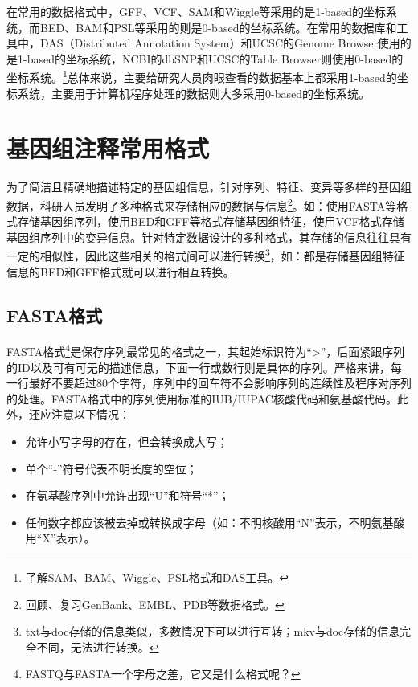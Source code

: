 \documentclass[11pt,a4paper,twoside]{book}
\begin{document}
在常用的数据格式中，GFF、VCF、SAM和Wiggle等采用的是1-based的坐标系统，而BED、BAM和PSL等采用的则是0-based的坐标系统。在常用的数据库和工具中，DAS（Distributed Annotation System）和UCSC的Genome Browser使用的是1-based的坐标系统，NCBI的dbSNP和UCSC的Table Browser则使用0-based的坐标系统。\footnote{了解SAM、BAM、Wiggle、PSL格式和DAS工具。}总体来说，主要给研究人员肉眼查看的数据基本上都采用1-based的坐标系统，主要用于计算机程序处理的数据则大多采用0-based的坐标系统。

\section{基因组注释常用格式}
为了简洁且精确地描述特定的基因组信息，针对序列、特征、变异等多样的基因组数据，科研人员发明了多种格式来存储相应的数据与信息\footnote{回顾、复习GenBank、EMBL、PDB等数据格式。}。如：使用FASTA等格式存储基因组序列，使用BED和GFF等格式存储基因组特征，使用VCF格式存储基因组序列中的变异信息。针对特定数据设计的多种格式，其存储的信息往往具有一定的相似性，因此这些相关的格式间可以进行转换\footnote{txt与doc存储的信息类似，多数情况下可以进行互转；mkv与doc存储的信息完全不同，无法进行转换。}，如：都是存储基因组特征信息的BED和GFF格式就可以进行相互转换。

\subsection{FASTA格式}
FASTA格式\footnote{FASTQ与FASTA一个字母之差，它又是什么格式呢？}是保存序列最常见的格式之一，其起始标识符为“>”，后面紧跟序列的ID以及可有可无的描述信息，下面一行或数行则是具体的序列。严格来讲，每一行最好不要超过80个字符，序列中的回车符不会影响序列的连续性及程序对序列的处理。FASTA格式中的序列使用标准的IUB/IUPAC核酸代码和氨基酸代码。此外，还应注意以下情况：
\begin{itemize}
  \item 允许小写字母的存在，但会转换成大写；
  \item 单个“-”符号代表不明长度的空位；
  \item 在氨基酸序列中允许出现“U”和符号“*”；
  \item 任何数字都应该被去掉或转换成字母（如：不明核酸用“N”表示，不明氨基酸用“X”表示）。
\end{itemize}
\end{document}
